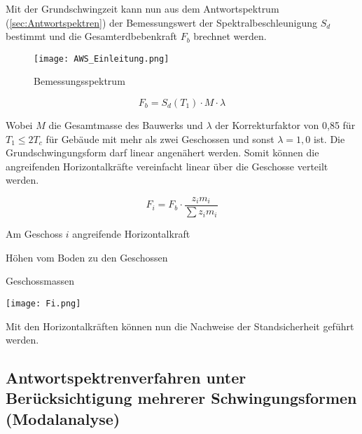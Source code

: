 Mit der Grundschwingzeit kann nun aus dem Antwortspektrum (\cref{sec:Antwortspektren}) der Bemessungswert der Spektralbeschleunigung $S_d$ bestimmt und die Gesamterdbebenkraft $F_b$ brechnet werden.

\begin{figure}[H]
    \centering
    \texttt{[image: AWS\_Einleitung.png]}
    \caption{Bemessungsspektrum}
\end{figure}

\begin{equation*}
F_b = S_d(T_1) \cdot M \cdot \lambda
\end{equation*}

Wobei $M$ die Gesamtmasse des Bauwerks und $\lambda$ der Korrekturfaktor von 0,85 für $T_1 \leq 2T_c$ für Gebäude mit mehr als zwei Geschossen und sonst $\lambda=1,0$ ist.
Die Grundschwingungsform darf linear angenähert werden. Somit können die angreifenden Horizontalkräfte vereinfacht linear über die Geschosse verteilt werden.

\begin{minipage}{0.6\textwidth}

\begin{equation*}
F_i = F_b \cdot \frac{z_i m_i}{\sum z_i m_i}
\end{equation*}

\vspace{2ex}
\vspace{2ex}

  Am Geschoss $i$ angreifende Horizontalkraft\par
{}  Höhen vom Boden zu den Geschossen\par
{}  Geschossmassen\par

\end{minipage}%
\hfill
\begin{minipage}{0.4\textwidth}

\begin{flushright}
\texttt{[image: Fi.png]}
\end{flushright}

\end{minipage}%

Mit den Horizontalkräften können nun die Nachweise der Standsicherheit geführt werden.

\subsection{Antwortspektrenverfahren unter Berücksichtigung mehrerer Schwingungsformen (Modalanalyse)}
\label{sec:Modalanalyse}

